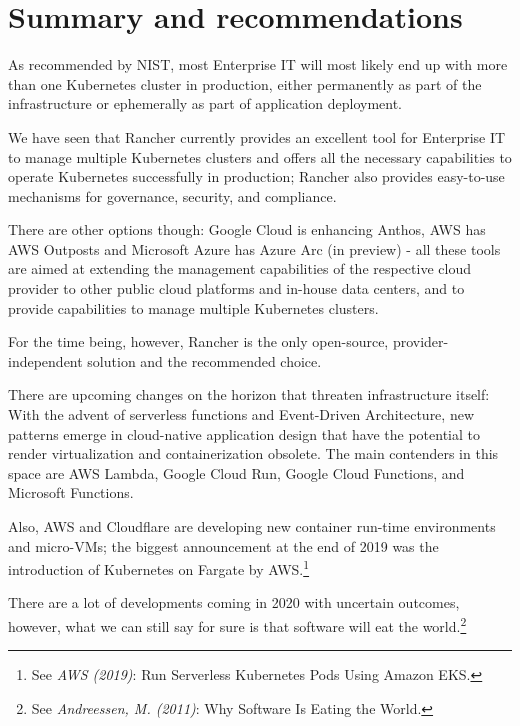 %
%

\pagebreak
\section{Summary and recommendations}

\onehalfspacing

As recommended by NIST, most Enterprise IT will most likely end up with more than one Kubernetes cluster in production, either permanently as part of the infrastructure or ephemerally as part of application deployment.

We have seen that Rancher currently provides an excellent tool for Enterprise IT to manage multiple Kubernetes clusters and offers all the necessary capabilities to operate Kubernetes successfully in production; Rancher also provides easy-to-use mechanisms for governance, security, and compliance.

There are other options though: Google Cloud is enhancing Anthos, AWS has AWS Outposts and Microsoft Azure has Azure Arc (in preview) - all these tools are aimed at extending the management capabilities of the respective cloud provider to other public cloud platforms and in-house data centers, and to provide capabilities to manage multiple Kubernetes clusters.

For the time being, however, Rancher is the only open-source, provider-independent solution and the recommended choice.

There are upcoming changes on the horizon that threaten infrastructure itself: With the advent of serverless functions and Event-Driven Architecture, new patterns emerge in cloud-native application design that have the potential to render virtualization and containerization obsolete. The main contenders in this space are AWS Lambda, Google Cloud Run, Google Cloud Functions, and Microsoft Functions.

Also, AWS and Cloudflare are developing new container run-time environments and micro-VMs; the biggest announcement at the end of 2019 was the introduction of Kubernetes on Fargate by AWS.\footnote{See \textit{AWS (2019)}: Run Serverless Kubernetes Pods Using Amazon EKS.\cite{eksFargate}}

There are a lot of developments coming in 2020 with uncertain outcomes, however, what we can still say for sure is that software will eat the world.\footnote{See \textit{Andreessen, M. (2011)}: Why Software Is Eating the World.\cite{softwareEats}}
